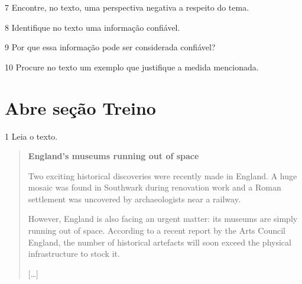 \num{7} Encontre, no texto, uma perspectiva negativa a respeito do tema.



\num{8} Identifique no texto uma informação confiável.



\num{9} Por que essa informação pode ser considerada confiável?



\num{10} Procure no texto um exemplo que justifique a medida mencionada.



\section{Abre seção Treino}

\num{1} Leia o texto.

\begin{quote}
\textbf{England's museums running out of space}

Two exciting historical discoveries were recently made in England. A huge mosaic was found in Southwark during renovation work and a Roman settlement was uncovered by archaeologists near a railway.

However, England is also facing an urgent matter: its museums are simply running out of space. According to a recent report by the Arts
Council England, the number of historical artefacts will soon exceed the physical infrastructure to stock it. 


{[}\ldots{}{]}

\end{quote}

